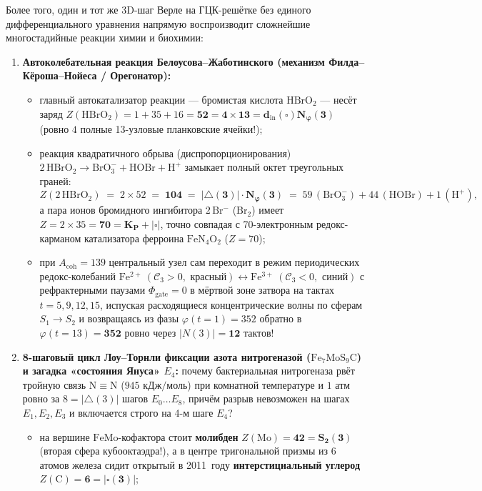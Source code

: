 Более того, один и тот же 3D-шаг Верле на ГЦК-решётке без единого дифференциального уравнения напрямую воспроизводит сложнейшие многостадийные реакции химии и биохимии:
\begin{enumerate}[label=\textbf{\arabic*.},leftmargin=*]
\item \textbf{Автоколебательная реакция Белоусова--Жаботинского (механизм Филда--Кёроша--Нойеса / Орегонатор):}
  \begin{itemize}[noitemsep]
  \item главный автокатализатор реакции --- бромистая кислота $\mathrm{HBrO_2}$ --- несёт заряд $Z(\mathrm{HBrO_2}) = 1 + 35 + 16 = \mathbf{52 = 4\times 13 = d_{\mathrm{in}}(\square)N_\varphi(3)}$ (ровно $4$ полные 13-узловые планковские ячейки!);
  \item реакция квадратичного обрыва (диспропорционирования) $2\,\mathrm{HBrO_2} \to \mathrm{BrO_3^-} + \mathrm{HOBr} + \mathrm{H^+}$ замыкает полный октет треугольных граней:
    \[
      Z(2\,\mathrm{HBrO_2}) \;=\; 2 \times 52 \;=\; \mathbf{104 \;=\; |{\triangle}(3)|\cdot N_\varphi(3)} \;=\; 59\,(\mathrm{BrO_3^-}) + 44\,(\mathrm{HOBr}) + 1\,(\mathrm{H^+}),
    \]
    а пара ионов бромидного ингибитора $2\,\mathrm{Br^-}$ ($\mathrm{Br_2}$) имеет $Z = 2\times 35 = \mathbf{70 = K_P + |\square|}$, точно совпадая с 70-электронным редокс-карманом катализатора ферроина $\mathrm{FeN_4O_2}$ ($Z=70$);
  \item при $A_{\mathrm{coh}} = 139$ центральный узел сам переходит в режим периодических редокс-колебаний $\mathrm{Fe^{2+}}\ (\mathcal{C}_3 > 0,\text{ красный}) \leftrightarrow \mathrm{Fe^{3+}}\ (\mathcal{C}_3 < 0,\text{ синий})$ с рефрактерными паузами $\Phi_{\mathrm{gate}} = 0$ в мёртвой зоне затвора на тактах $t = 5, 9, 12, 15$, испуская расходящиеся концентрические волны по сферам $S_1 \to S_2$ и возвращаясь из фазы $\varphi(t=1) = 352$ обратно в $\varphi(t=13) = \mathbf{352}$ ровно через $|N(3)| = \mathbf{12\text{ тактов}}$!
  \end{itemize}
\item \textbf{8-шаговый цикл Лоу--Торнли фиксации азота нитрогеназой ($\mathrm{Fe_7MoS_9C}$) и загадка «состояния Януса» $E_4$:}
  почему бактериальная нитрогеназа рвёт тройную связь $\mathrm{N\equiv N}$ ($945\text{ кДж/моль}$) при комнатной температуре и $1\text{ атм}$ ровно за $8 = |{\triangle}(3)|$ шагов $E_0\dots E_8$, причём разрыв невозможен на шагах $E_1, E_2, E_3$ и включается строго на 4-м шаге $E_4$?
  \begin{itemize}[noitemsep]
  \item на вершине $\mathrm{FeMo}$-кофактора стоит \textbf{молибден} $Z(\mathrm{Mo}) = \mathbf{42 = S_2(3)}$ (вторая сфера кубооктаэдра!), а в центре тригональной призмы из $6$ атомов железа сидит открытый в 2011~году \textbf{интерстициальный углерод} $Z(\mathrm{C}) = \mathbf{6 = |\square(3)|}$;

\end{itemize}
\end{enumerate}
